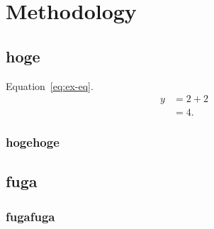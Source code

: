 \section{Methodology}
\subsection{hoge}
    Equation~\ref{eq:ex-eq}.
    \begin{equation}
        \begin{split}
            y &= 2 + 2 \\
            &= 4.
        \end{split}
        \label{eq:ex-eq}
    \end{equation}
\subsubsection{hogehoge}
\subsection{fuga}
\subsubsection{fugafuga}